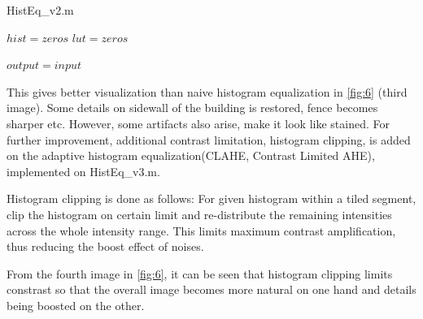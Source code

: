 \documentclass[extendedabs]{bmvc2k}
\begin{document}
\begin{algorithm}
\caption{HistEq\_v2.m}
\label{alg:4}
$hist = zeros$\;
$lut = zeros$\;
        
$output = input$\;
\end{algorithm}

This gives better visualization than naive histogram equalization in 
\figurename{\ref{fig:6}} (third image). Some details on sidewall of the building is restored,
fence becomes sharper etc. However, some artifacts also arise, make it look like stained.
For further improvement, additional contrast limitation, histogram clipping, is added on the adaptive
histogram equalization(CLAHE, Contrast Limited AHE), implemented on HistEq\_v3.m.

Histogram clipping is done as follows: For given histogram within a tiled
segment, clip the histogram on certain limit and re-distribute the remaining
intensities across the whole intensity range. This limits maximum contrast
amplification, thus reducing the boost effect of noises.

From the fourth image in \figurename{\ref{fig:6}}, it can be seen that 
histogram clipping limits constrast so that the overall image becomes more
natural on one hand and details being boosted on the other.
\end{document}

